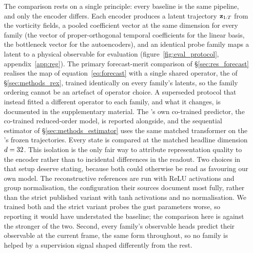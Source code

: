 The comparison rests on a single principle: every baseline is the same pipeline, and only the encoder differs. Each encoder produces a latent trajectory $\mathbf{z}_{1:T}$ from the vorticity fields, a pooled coefficient vector at the same dimension for every family (the vector of proper-orthogonal temporal coefficients for the linear basis, the bottleneck vector for the autoencoders), and an identical probe family maps a latent to a physical observable for evaluation (figure~\ref{fig:eval_protocol}, appendix~\ref{app:reg}). The primary forecast-merit comparison of \S\ref{sec:res_forecast} realises the map of equation~\eqref{eq:forecast} with a single shared operator, the \DirectFC{} of \S\ref{sec:methods_rex}, trained identically on every family's latents, so the family ordering cannot be an artefact of operator choice. A superseded protocol that instead fitted a different operator to each family, and what it changes, is documented in the supplementary material. The \PredState's own co-trained predictor, the co-trained reduced-order model, is reported alongside, and the sequential estimator of \S\ref{sec:methods_estimator} uses the same matched transformer on the \PredState's frozen trajectories. Every state is compared at the matched headline dimension $d = 32$. This isolation is the only fair way to attribute representation quality to the encoder rather than to incidental differences in the readout. Two choices in that setup deserve stating, because both could otherwise be read as favouring our own model. The reconstructive references are run with ReLU activations and group normalisation, the configuration their sources document most fully, rather than the strict published variant with tanh activations and no normalisation. We trained both and the strict variant probes the gust parameters worse, so reporting it would have understated the baseline; the comparison here is against the stronger of the two. Second, every family's observable heads predict their observable at the current frame, the same form throughout, so no family is helped by a supervision signal shaped differently from the rest.\re



